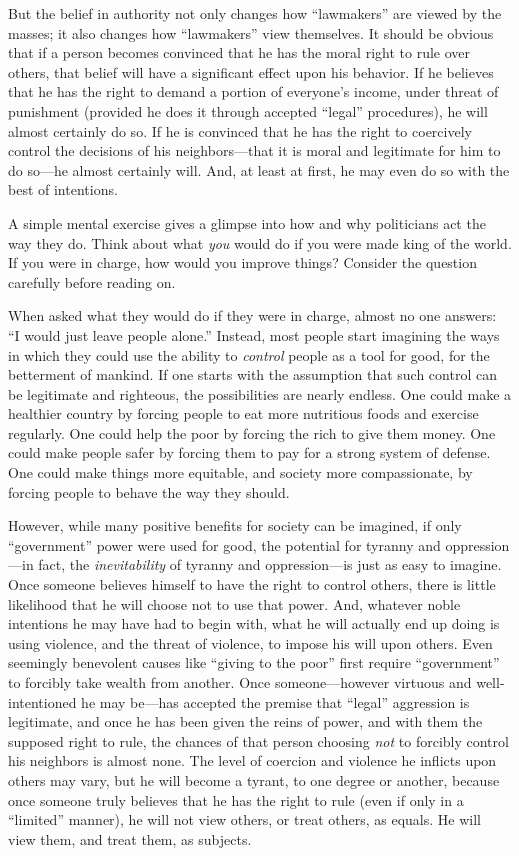 \documentclass{book}
\begin{document}
But the belief in authority not only changes how \enquote{lawmakers} are viewed by the masses; it also changes how \enquote{lawmakers} view themselves. It should be obvious that if a person becomes convinced that he has the moral right to rule over others, that belief will have a significant effect upon his behavior. If he believes that he has the right to demand a portion of everyone's income, under threat of punishment (provided he does it through accepted \enquote{legal} procedures), he will almost certainly do so. If he is convinced that he has the right to coercively control the decisions of his neighbors---that it is moral and legitimate for him to do so---he almost certainly will. And, at least at first, he may even do so with the best of intentions.

A simple mental exercise gives a glimpse into how and why politicians act the way they do. Think about what \emph{you} would do if you were made king of the world. If you were in charge, how would you improve things? Consider the question carefully before reading on.

When asked what they would do if they were in charge, almost no one answers: \enquote{I would just leave people alone.} Instead, most people start imagining the ways in which they could use the ability to \emph{control} people as a tool for good, for the betterment of mankind. If one starts with the assumption that such control can be legitimate and righteous, the possibilities are nearly endless. One could make a healthier country by forcing people to eat more nutritious foods and exercise regularly. One could help the poor by forcing the rich to give them money. One could make people safer by forcing them to pay for a strong system of defense. One could make things more equitable, and society more compassionate, by forcing people to behave the way they should.

However, while many positive benefits for society can be imagined, if only \enquote{government} power were used for good, the potential for tyranny and oppression---in fact, the \emph{inevitability} of tyranny and oppression---is just as easy to imagine. Once someone believes himself to have the right to control others, there is little likelihood that he will choose not to use that power. And, whatever noble intentions he may have had to begin with, what he will actually end up doing is using violence, and the threat of violence, to impose his will upon others. Even seemingly benevolent causes like \enquote{giving to the poor} first require \enquote{government} to forcibly take wealth from another. Once someone---however virtuous and well-intentioned he may be---has accepted the premise that \enquote{legal} aggression is legitimate, and once he has been given the reins of power, and with them the supposed right to rule, the chances of that person choosing \emph{not} to forcibly control his neighbors is almost none. The level of coercion and violence he inflicts upon others may vary, but he will become a tyrant, to one degree or another, because once someone truly believes that he has the right to rule (even if only in a \enquote{limited} manner), he will not view others, or treat others, as equals. He will view them, and treat them, as subjects.
\end{document}
